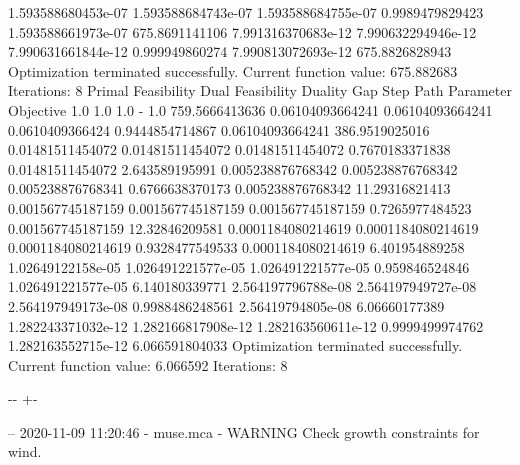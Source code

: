 \documentclass[letterpaper,10pt,english]{sphinxmanual}
\newlength\nbsphinxcodecellspacing
\begin{document}
{\begin{sphinxVerbatim}[commandchars=\\\{\}]
1.593588680453e-07  1.593588684743e-07  1.593588684755e-07  0.9989479829423  1.593588661973e-07  675.8691141106
7.991316370683e-12  7.990632294946e-12  7.990631661844e-12  0.999949860274   7.990813072693e-12  675.8826828943
Optimization terminated successfully.
         Current function value: 675.882683
         Iterations: 8
Primal Feasibility  Dual Feasibility    Duality Gap         Step             Path Parameter      Objective
1.0                 1.0                 1.0                 -                1.0                 759.5666413636
0.06104093664241    0.06104093664241    0.0610409366424     0.9444854714867  0.06104093664241    386.9519025016
0.01481511454072    0.01481511454072    0.01481511454072    0.7670183371838  0.01481511454072    2.643589195991
0.005238876768342   0.005238876768342   0.005238876768341   0.6766638370173  0.005238876768342   11.29316821413
0.001567745187159   0.001567745187159   0.001567745187159   0.7265977484523  0.001567745187159   12.32846209581
0.0001184080214619  0.0001184080214619  0.0001184080214619  0.9328477549533  0.0001184080214619  6.401954889258
1.02649122158e-05   1.026491221577e-05  1.026491221577e-05  0.959846524846   1.026491221577e-05  6.140180339771
2.564197796788e-08  2.564197949727e-08  2.564197949173e-08  0.9988486248561  2.56419794805e-08   6.06660177389
1.282243371032e-12  1.282166817908e-12  1.282163560611e-12  0.9999499974762  1.282163552715e-12  6.066591804033
Optimization terminated successfully.
         Current function value: 6.066592
         Iterations: 8
\end{sphinxVerbatim}
}

{

\kern-\sphinxverbatimsmallskipamount\kern-\baselineskip
\kern+\FrameHeightAdjust\kern-\fboxrule
\vspace{\nbsphinxcodecellspacing}

\begin{sphinxVerbatim}[commandchars=\\\{\}]
-- 2020-11-09 11:20:46 - muse.mca - WARNING
Check growth constraints for wind.

\end{sphinxVerbatim}
}
\end{document}
